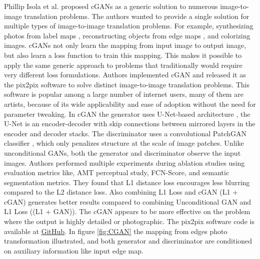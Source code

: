 Phillip Isola et al.\cite{isola2018imagetoimage} proposed \acp{cGAN} as a generic solution to numerous image-to-image translation problems. The authors wanted to provide a single solution for multiple types of image-to-image translation problems. For example, synthesizing photos from label maps \cite{cordts2016cityscapes}, reconstructing objects from edge maps \cite{zhu2018generative} \cite{6909426} , and colorizing images. \acp{cGAN} not only learn the mapping from input image to output image, but also learn a loss function to train this mapping. This makes it possible to apply the same generic approach to problems that traditionally would require very different loss formulations. Authors implemented \ac{cGAN} and released it as the pix2pix software to solve distinct image-to-image translation problems. This software is popular among a large number of internet users, many of them are artists, because of its wide applicability and ease of adoption without the need for parameter tweaking. In \ac{cGAN} the generator uses U-Net-based architecture \cite{ronneberger2015unet}, the U-Net is an encoder-decoder with skip connections between mirrored layers in the encoder and decoder stacks. The discriminator uses a convolutional PatchGAN classifier \cite{li2016precomputed}, which only penalizes structure at the scale of image patches. Unlike unconditional GANs, both the generator and discriminator observe the input images. Authors performed multiple experiments during ablation studies using evaluation metrics like, \ac{AMT} perceptual study, FCN-Score, and semantic segmentation metrics. They found that L1 distance loss encourages less blurring compared to the L2 distance loss. Also combining L1 Loss and \ac{cGAN} (L1 + \ac{cGAN}) generates better results compared to combining Unconditional \ac{GAN} and L1 Loss ((L1 + \ac{GAN})). The \ac{cGAN} appears to be more effective on the problem where the output is highly detailed or photographic. The pix2pix software code is available at \href{https://github.com/phillipi/pix2pix.}{GitHub}. In figure \ref{fig:CGAN} the mapping from edges \textrightarrow photo transformation illustrated, and both generator and discriminator are conditioned on auxiliary information like input edge map.



